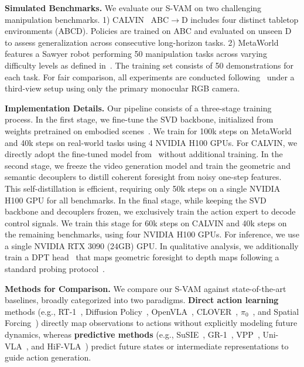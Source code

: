 
\noindent \textbf{Simulated Benchmarks.} 
We evaluate our S-VAM on two challenging manipulation benchmarks. 1) CALVIN~\cite{mees2022calvin} ABC$\rightarrow$D includes four distinct tabletop environments (ABCD). Policies are trained on ABC and evaluated on unseen D to assess generalization across consecutive long-horizon tasks. 2) MetaWorld~\cite{yu2020meta} features a Sawyer robot performing 50 manipulation tasks across varying difficulty levels as defined in~\cite{seo2023masked}. The training set consists of 50 demonstrations for each task. For fair comparison, all experiments are conducted following~\cite{huvideo} under a third-view setup using only the primary monocular RGB camera.


\noindent \textbf{Implementation Details.}
Our pipeline consists of a three-stage training process.
In the first stage, we fine-tune the SVD backbone, initialized from weights pretrained on embodied scenes~\cite{huvideo}.
We train for 100k steps on MetaWorld and 40k steps on real-world tasks using 4 NVIDIA H100 GPUs.
For CALVIN, we directly adopt the fine-tuned model from~\cite{huvideo} without additional training.
In the second stage, we freeze the video generation model and train the geometric and semantic decouplers to distill coherent foresight from noisy one-step features. This self-distillation is efficient, requiring only 50k steps on a single NVIDIA H100 GPU for all benchmarks.
In the final stage, while keeping the SVD backbone and decouplers frozen, we exclusively train the action expert to decode control signals. We train this stage for 60k steps on CALVIN and 40k steps on the remaining benchmarks, using four NVIDIA H100 GPUs. For inference, we use a single NVIDIA RTX 3090 (24GB) GPU. In qualitative analysis, we additionally train a DPT head~\cite{Ranftl_2021_ICCV} that maps geometric foresight to depth maps following a standard probing protocol~\cite{li2025spatial,wu2026geometry}. 

\noindent \textbf{Methods for Comparison.} 
We compare our S-VAM against state-of-the-art baselines, broadly categorized into two paradigms. \textbf{Direct action learning} methods (e.g., RT-1~\cite{brohan2022rt}, Diffusion Policy~\cite{chi2025diffusion}, OpenVLA~\cite{kim2025openvla}, CLOVER~\cite{bu2024closedloop}, $\pi_0$~\cite{black2024pi_0}, and Spatial Forcing~\cite{li2025spatial}) directly map observations to actions without explicitly modeling future dynamics, whereas \textbf{predictive methods} (e.g., SuSIE~\cite{black2024zeroshot}, GR-1~\cite{wu2023unleashing}, VPP~\cite{huvideo}, Uni-VLA~\cite{wang2025unified}, and HiF-VLA~\cite{lin2025hif}) predict future states or intermediate representations to guide action generation.
